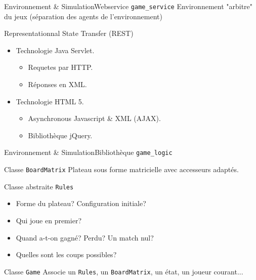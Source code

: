 
\begin{frame}{Environnement \& Simulation}{Webservice \texttt{game\_service}}
Environnement "arbitre" du jeux (séparation des agents de l'environnement)

\begin{block}{Representationnal State Transfer (REST)}
\begin{itemize}
\item Technologie Java Servlet.
	\begin{itemize}
	\item Requetes par HTTP.
	\item Réponses en XML.
	\end{itemize}
\item Technologie HTML 5.
	\begin{itemize}
	\item Asynchronous Javascript \& XML (AJAX).
	\item Bibliothèque jQuery.
	\end{itemize}
\end{itemize}
\end{block}


\end{frame}



\begin{frame}{Environnement \& Simulation}{Bibliothèque \texttt{game\_logic}}

\begin{block}{Classe \texttt{BoardMatrix}}
Plateau sous forme matricielle avec accesseurs adaptés.
\end{block}

\pause

\begin{block}{Classe abstraite \texttt{Rules}}
\begin{itemize}
\item Forme du plateau? Configuration initiale?
\item Qui joue en premier?
\item Quand a-t-on gagné? Perdu? Un match nul?
\item Quelles sont les coups possibles?
\end{itemize}
\end{block}

\pause

\begin{block}{Classe \texttt{Game}}
Associe un \texttt{Rules}, un \texttt{BoardMatrix}, un état, un joueur courant...
\end{block}

\end{frame}


